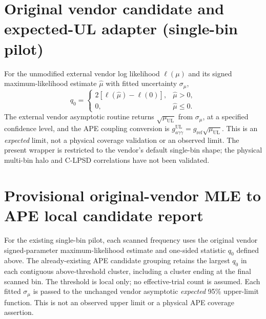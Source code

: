 \documentclass{article}
\begin{document}
\section*{Original vendor candidate and expected-UL adapter (single-bin pilot)}
For the unmodified external vendor log likelihood $\ell(\mu)$ and its signed
maximum-likelihood estimate $\hat\mu$ with fitted uncertainty $\sigma_\mu$,
\begin{equation}
q_0=\begin{cases}
2[\ell(\hat\mu)-\ell(0)], & \hat\mu>0,\\
0, & \hat\mu\leq 0.
\end{cases}
\end{equation}
The external vendor asymptotic routine returns $\sqrt{\mu_{\mathrm{UL}}}$
from $\sigma_\mu$, at a specified confidence level, and the APE coupling
conversion is $g_{a\gamma\gamma}^{\mathrm{UL}}=
 g_{\mathrm{ref}}\sqrt{\mu_{\mathrm{UL}}}$.
This is an \emph{expected} limit, not a physical coverage validation or an
observed limit. The present wrapper is restricted to the vendor's default
single-bin shape; the physical multi-bin halo and C-LPSD correlations have
not been validated.


\section*{Provisional original-vendor MLE to APE local candidate report}
For the existing single-bin pilot, each scanned frequency uses the original
vendor signed-parameter maximum-likelihood estimate and one-sided statistic
$q_0$ defined above. The already-existing APE candidate grouping retains
the largest $q_0$ in each contiguous above-threshold cluster, including a
cluster ending at the final scanned bin. The threshold is local only;
no effective-trial count is assumed. Each fitted $\sigma_\mu$ is passed to
the unchanged vendor asymptotic \emph{expected} 95\% upper-limit function.
This is not an observed upper limit or a physical APE coverage assertion.
\end{document}
